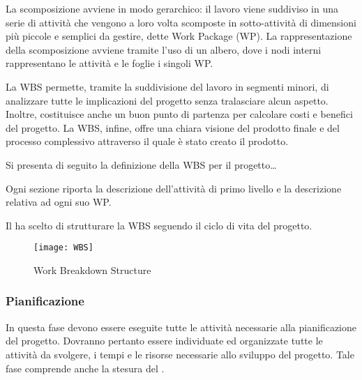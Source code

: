 La scomposizione avviene in modo gerarchico: il lavoro viene suddiviso in una serie di attività che vengono a loro volta scomposte in sotto-attività di dimensioni più piccole e semplici da gestire, dette Work Package (WP).
La rappresentazione della scomposizione avviene tramite l'uso di un albero, dove i nodi interni rappresentano le attività e le foglie i singoli WP\@.

La WBS permette, tramite la suddivisione del lavoro in segmenti minori, di analizzare tutte le implicazioni del progetto senza tralasciare alcun aspetto. Inoltre, costituisce anche un buon punto di partenza per calcolare costi e benefici del progetto.
La WBS, infine, offre una chiara visione del prodotto finale e del processo complessivo attraverso il quale è stato creato il prodotto.

Si presenta di seguito la definizione della WBS per il progetto\ldots%

Ogni sezione riporta la descrizione dell'attività di primo livello e la descrizione relativa ad ogni suo WP. 

Il  ha scelto di strutturare la WBS seguendo il ciclo di vita del progetto.

\begin{figure}[!h]
  \centering
  \texttt{[image: WBS]}
  \caption{Work Breakdown Structure}
\end{figure}

\subsubsection{Pianificazione}
In questa fase devono essere eseguite tutte le attività necessarie alla pianificazione del progetto.
Dovranno pertanto essere individuate ed organizzate tutte le attività da svolgere, i tempi e le risorse necessarie allo sviluppo del progetto. Tale fase comprende anche la stesura del .
		
